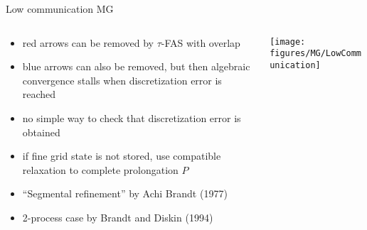 \begin{frame}{Low communication MG}
  \begin{columns}
    \begin{column}{0.55\textwidth}
      \begin{itemize}
      \item {\color{red} red arrows} can be removed by $\tau$-FAS with overlap
      \item {\color{blue} blue arrows} can also be removed, but then
        algebraic convergence stalls when discretization error is
        reached
      \item no simple way to check that discretization error is obtained
      \item if fine grid state is not stored, use compatible relaxation to complete prolongation $P$
      \item ``Segmental refinement'' by Achi Brandt (1977)
      \item 2-process case by Brandt and Diskin (1994)
      \end{itemize}
    \end{column}
    \begin{column}{0.45\textwidth}
      \vspace{-2em}
      \texttt{[image: figures/MG/LowCommunication]}
    \end{column}
  \end{columns}
\end{frame}
